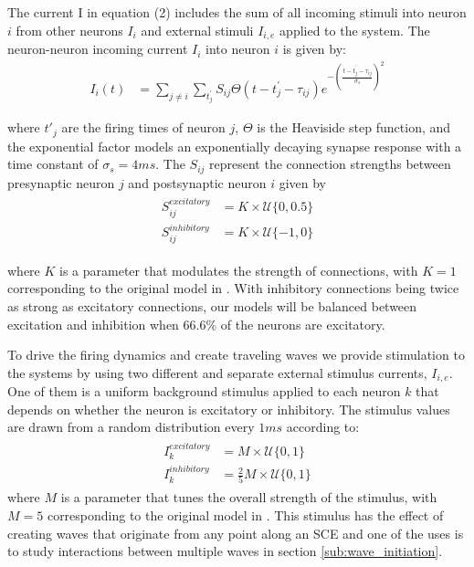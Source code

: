 \documentclass[12pt]{article}
\begin{document}
The current I in equation (2) includes the sum of all incoming stimuli into neuron $i$ from other neurons $I_i$ and external stimuli $I_{i,e}$ applied to the system. 
The neuron-neuron incoming current $I_i$ into neuron $i$ is given by:
\begin{align}
 I_i(t) &= \sum_{j\ne i} \sum_{t^\prime_j} S_{ij}  \Theta(t-t^\prime_j-\tau_{ij})e^{-(\frac{t-t^\prime_j-\tau_{ij}}{\sigma_s})^2}
\end{align}

where $t'_j$ are the firing times of neuron $j$, $\Theta$ is the Heaviside step function, and the exponential factor models an exponentially decaying synapse response with a time constant of $\sigma_s = 4 ms$. 
The $S_{ij}$ represent the connection strengths between presynaptic neuron $j$ and postsynaptic neuron $i$ given by
\begin{align}
 \begin{split}
  S_{ij}^{excitatory} &= K \times \mathcal{U}\{0,0.5 \} \\
  S_{ij}^{inhibitory} &= K \times \mathcal{U}\{-1,0 \} 
 \end{split}
\end{align}

where $K$ is a parameter that modulates the strength of connections, with $K=1$ corresponding to the original model in \parencite{izhikevich2003}.
\color{red}With inhibitory connections being twice as strong as excitatory connections, our models will be balanced between excitation and inhibition when $66.6\%$ of the neurons are excitatory\color{black}. 

To drive the firing dynamics and create traveling waves we provide stimulation to the systems by using two different and separate external stimulus currents, $I_{i,e}$. 
One of them is a uniform background stimulus applied to each neuron $k$ that depends on whether the neuron is excitatory or inhibitory.
The stimulus values are drawn from a random distribution every $1 ms$ according to:
\begin{align}\label{eq:randomstim}
 \begin{split}
  I_k^{excitatory} &= M \times \mathcal{U}\{0,1 \} \\
  I_k^{inhibitory} &= \frac{2}{5} M \times \mathcal{U}\{0,1 \}
 \end{split}
\end{align}
where $M$ is a parameter that tunes the overall strength of the stimulus, with $M=5$ corresponding to the original model in \parencite{izhikevich2003}. 
This stimulus has the effect of creating waves that originate from any point along an SCE and one of the uses is to study interactions between multiple waves in section \ref{sub:wave_initiation}.
\end{document}

